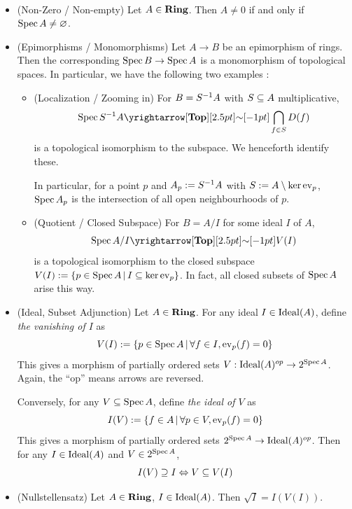 \begin{prop}~

  \begin{itemize}
    \item (Non-Zero / Non-empty)
    Let $A \in \mathbf{Ring}$.
    Then $A \neq 0$ if and only if $\operatorname{Spec} A \neq \varnothing$.
    \item (Epimorphisms / Monomorphisms)
    Let $A \to B$ be an epimorphism of rings.
    Then the corresponding $\operatorname{Spec} B \to \operatorname{Spec} A$ is a monomorphism of 
    topological spaces. 
    In particular, 
    we have the following two examples : 
    \begin{itemize}
      \item (Localization / Zooming in)
      For $B = S^{-1} A$ with $S \subseteq A$ multiplicative,
      \[
        \spec S\inv A \map{\sim}{\TOP} \bigcap_{f \in S} D(f)
      \]
      is a topological isomorphism to the subspace. 
      We henceforth identify these. 

      In particular, for a point $p$ and 
      $A_p := S^{-1} A$ with $S := A\setminus\ker\operatorname{ev}_p$,
      $\operatorname{Spec} A_p$ is the intersection of all open neighbourhoods of $p$.
      
      \item (Quotient / Closed Subspace)
      For $B = A / I$ for some ideal $I$ of $A$,
      \[
        \spec A / I \map{\sim}{\TOP} V(I)
      \]
      is a topological isomorphism to the closed subspace 
      $V(I) := \left\{p \in \operatorname{Spec} A \,|\, I \subseteq \ker\operatorname{ev}_p\right\}$.
      In fact, all closed subsets of $\operatorname{Spec} A$ arise this way. 
    \end{itemize}
    \item (Ideal, Subset Adjunction)
    Let $A \in \mathbf{Ring}$.
    For any ideal $I \in \operatorname{Ideal}(A)$, 
    define \emph{the vanishing of $I$} as \[
      V(I) := \left\{p \in \operatorname{Spec} A \,|\, \forall f \in I, \operatorname{ev}_p(f) = 0\right\}
    \]
    This gives a morphism of partially ordered sets 
    $V : \operatorname{Ideal}(A)^{op} \to 2^{\operatorname{Spec} A}$.
    Again, the ``op'' means arrows are reversed.

    Conversely, for any $V \subseteq \operatorname{Spec} A$,
    define \emph{the ideal of $V$} as \[
      I(V) := \left\{f \in A \,|\, \forall p \in V, \operatorname{ev}_p(f) = 0\right\}
    \]
    This gives a morphism of partially ordered sets 
    $2^{\operatorname{Spec} A} \to \operatorname{Ideal}(A)^{op}$.
    Then for any $I \in \operatorname{Ideal}(A)$ and $V \in 2^{\operatorname{Spec} A}$,
    \[
      I(V) \supseteq I \Leftrightarrow V \subseteq V(I)
    \]
    \item (Nullstellensatz)
    Let $A \in \mathbf{Ring}$, $I \in \operatorname{Ideal}(A)$.
    Then $\sqrt{I} = I(V(I))$.


\end{itemize}
\end{prop}
